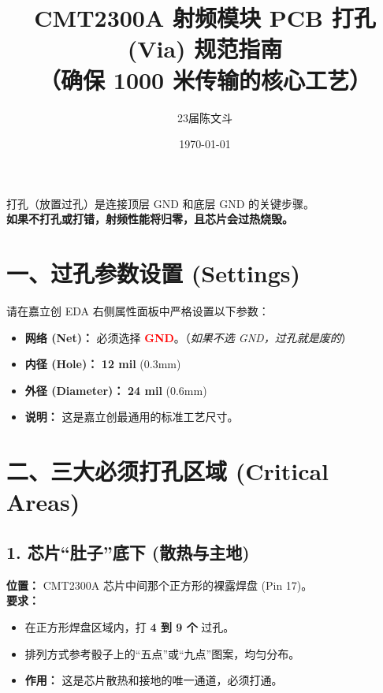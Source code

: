 \documentclass[a4paper,12pt]{article}
\title{\textbf{CMT2300A 射频模块 PCB 打孔 (Via) 规范指南}\\ \large （确保 1000 米传输的核心工艺）}
\author{23届陈文斗}
\date{\today}
\begin{document}
	\maketitle

	\begin{tcolorbox}[colback=yellow!10!white,colframe=red!75!black,title=⚠️ 操作前必读]
		打孔（放置过孔）是连接顶层 GND 和底层 GND 的关键步骤。\\
		\textbf{如果不打孔或打错，射频性能将归零，且芯片会过热烧毁。}
	\end{tcolorbox}

	\section{一、过孔参数设置 (Settings)}
	请在嘉立创 EDA 右侧属性面板中严格设置以下参数：

	\begin{itemize}
		\item \textbf{网络 (Net)：} 必须选择 \textcolor{red}{\textbf{GND}}。（\textit{如果不选 GND，过孔就是废的}）
		\item \textbf{内径 (Hole)：} \textbf{12 mil} (0.3mm)
		\item \textbf{外径 (Diameter)：} \textbf{24 mil} (0.6mm)
		\item \textbf{说明：} 这是嘉立创最通用的标准工艺尺寸。
	\end{itemize}

	\section{二、三大必须打孔区域 (Critical Areas)}

	\subsection{1. 芯片“肚子”底下 (散热与主地)}
	\textbf{位置：} CMT2300A 芯片中间那个正方形的裸露焊盘 (Pin 17)。\\
	\textbf{要求：}
	\begin{itemize}
		\item 在正方形焊盘区域内，打 \textbf{4 到 9 个} 过孔。
		\item 排列方式参考骰子上的“五点”或“九点”图案，均匀分布。
		\item \textbf{作用：} 这是芯片散热和接地的唯一通道，必须打通。
	\end{itemize}
\end{document}

